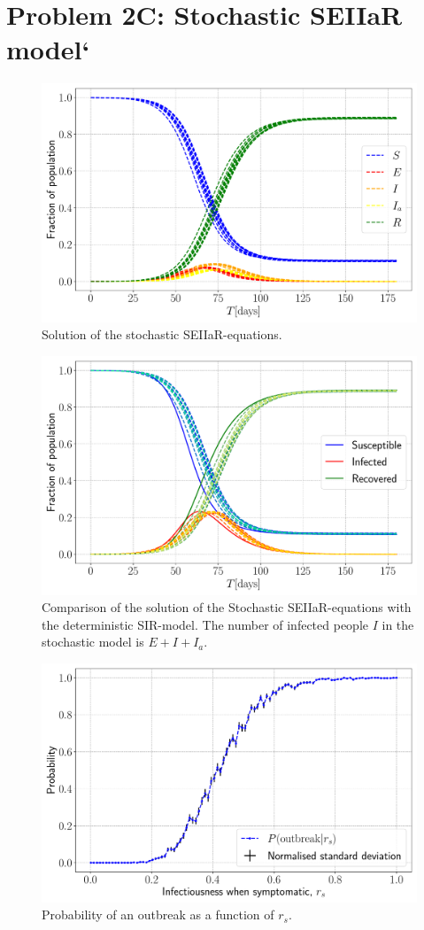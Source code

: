 \section{Problem 2C: Stochastic SEIIaR model`}

\begin{figure}[htb]
	\centering
	\includegraphics[width=0.8\columnwidth]{../fig/2Ca_SEIIaR.pdf}
	\caption{Solution of the stochastic SEIIaR-equations.}
	\label{fig:SEIIaR}
\end{figure}

\begin{figure}[htb]
	\centering
	\includegraphics[width=0.8\columnwidth]{../fig/2Ca_comp.pdf}
	\caption{Comparison of the solution of the Stochastic SEIIaR-equations with the deterministic SIR-model. The number of infected people $I$ in the stochastic model is $E + I + I_a$.}
	\label{fig:SEIIaR_compare}
\end{figure}

\begin{figure}[htb]
	\centering
	\includegraphics[width=0.8\columnwidth]{../fig/2Cb_probs.pdf}
	\caption{Probability of an outbreak as a function of $r_s$.}
	\label{fig:rs_prob}
\end{figure}